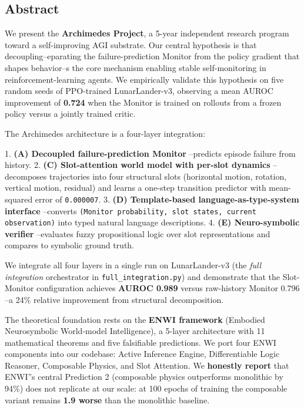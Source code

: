 \documentclass[11pt]{article}
\begin{document}
\hrulefill

\subsection{Abstract}

We present the \textbf{Archimedes Project}, a 5-year independent research program toward
a self-improving AGI substrate. Our central hypothesis is that decoupling--eparating
the failure-prediction Monitor from the policy gradient that shapes behavior--s the
core mechanism enabling stable self-monitoring in reinforcement-learning agents. We
empirically validate this hypothesis on five random seeds of PPO-trained
LunarLander-v3, observing a mean AUROC improvement of \textbf{0.724} when the Monitor is
trained on rollouts from a frozen policy versus a jointly trained critic.

The Archimedes architecture is a four-layer integration:

1. \textbf{(A) Decoupled failure-prediction Monitor} --predicts episode failure from history.
2. \textbf{(C) Slot-attention world model with per-slot dynamics} --decomposes trajectories
   into four structural slots (horizontal motion, rotation, vertical motion, residual)
   and learns a one-step transition predictor with mean-squared error of \texttt{0.000007}.
3. \textbf{(D) Template-based language-as-type-system interface} --converts
   \texttt{(Monitor probability, slot states, current observation)} into typed natural
   language descriptions.
4. \textbf{(E) Neuro-symbolic verifier} --evaluates fuzzy propositional logic over slot
   representations and compares to symbolic ground truth.

We integrate all four layers in a single run on LunarLander-v3 (the \textit{full integration}
orchestrator in \texttt{full\_integration.py}) and demonstrate that the Slot-Monitor
configuration achieves \textbf{AUROC 0.989} versus raw-history Monitor 0.796 --a 24\%
relative improvement from structural decomposition.

The theoretical foundation rests on the \textbf{ENWI framework} (Embodied Neurosymbolic
World-model Intelligence), a 5-layer architecture with 11 mathematical theorems and
five falsifiable predictions. We port four ENWI components into our codebase:
Active Inference Engine, Differentiable Logic Reasoner, Composable Physics, and Slot
Attention. We \textbf{honestly report} that ENWI''s central Prediction 2 (composable
physics outperforms monolithic by 94\%) does not replicate at our scale: at 100
epochs of training the composable variant remains \textbf{1.9 worse} than the monolithic
baseline.
\end{document}
